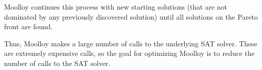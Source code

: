 \documentclass[11pt]{article}
\theoremstyle{definition}
\begin{document}
Moolloy continues this process with new starting solutions (that are
not dominated by any previously discovered solution) until all
solutions on the Pareto front are found.

Thus, Moolloy makes a large number of calls to the underlying SAT
solver. These are extremely expensive calls, so the goal for optimizing
Moolloy is to reduce the number of calls to the SAT solver.

\pagebreak

\pagebreak

\pagebreak



\end{document}
